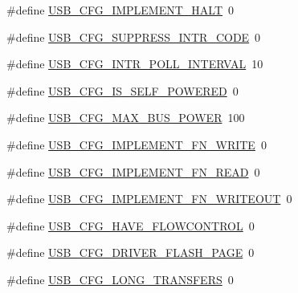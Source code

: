 \begin{DoxyCompactItemize}
\item 
\#define \hyperlink{mhvlib-_vusb-_console_2vusb_2usbconfig-prototype_8h_af2a9b3ecff1707f1b6554a881a87b954}{U\-S\-B\-\_\-\-C\-F\-G\-\_\-\-I\-M\-P\-L\-E\-M\-E\-N\-T\-\_\-\-H\-A\-L\-T}~0
\item 
\#define \hyperlink{mhvlib-_vusb-_console_2vusb_2usbconfig-prototype_8h_a51ab4fa0f312f536ec6d4bc99a75c1b6}{U\-S\-B\-\_\-\-C\-F\-G\-\_\-\-S\-U\-P\-P\-R\-E\-S\-S\-\_\-\-I\-N\-T\-R\-\_\-\-C\-O\-D\-E}~0
\item 
\#define \hyperlink{mhvlib-_vusb-_console_2vusb_2usbconfig-prototype_8h_a9cccddfefa62f926a0d7bba9f183a4d3}{U\-S\-B\-\_\-\-C\-F\-G\-\_\-\-I\-N\-T\-R\-\_\-\-P\-O\-L\-L\-\_\-\-I\-N\-T\-E\-R\-V\-A\-L}~10
\item 
\#define \hyperlink{mhvlib-_vusb-_console_2vusb_2usbconfig-prototype_8h_ad5fd70b5fabd8abd34d5b9ef7100b709}{U\-S\-B\-\_\-\-C\-F\-G\-\_\-\-I\-S\-\_\-\-S\-E\-L\-F\-\_\-\-P\-O\-W\-E\-R\-E\-D}~0
\item 
\#define \hyperlink{mhvlib-_vusb-_console_2vusb_2usbconfig-prototype_8h_abe324d9b00dc186bcbac65ed0f94811c}{U\-S\-B\-\_\-\-C\-F\-G\-\_\-\-M\-A\-X\-\_\-\-B\-U\-S\-\_\-\-P\-O\-W\-E\-R}~100
\item 
\#define \hyperlink{mhvlib-_vusb-_console_2vusb_2usbconfig-prototype_8h_a7f117e204e14ff1028ada59f622173f2}{U\-S\-B\-\_\-\-C\-F\-G\-\_\-\-I\-M\-P\-L\-E\-M\-E\-N\-T\-\_\-\-F\-N\-\_\-\-W\-R\-I\-T\-E}~0
\item 
\#define \hyperlink{mhvlib-_vusb-_console_2vusb_2usbconfig-prototype_8h_a6be8d20f2d0eb0e87460b26681e60611}{U\-S\-B\-\_\-\-C\-F\-G\-\_\-\-I\-M\-P\-L\-E\-M\-E\-N\-T\-\_\-\-F\-N\-\_\-\-R\-E\-A\-D}~0
\item 
\#define \hyperlink{mhvlib-_vusb-_console_2vusb_2usbconfig-prototype_8h_afebecafb2986c559a5d346d601be9de3}{U\-S\-B\-\_\-\-C\-F\-G\-\_\-\-I\-M\-P\-L\-E\-M\-E\-N\-T\-\_\-\-F\-N\-\_\-\-W\-R\-I\-T\-E\-O\-U\-T}~0
\item 
\#define \hyperlink{mhvlib-_vusb-_console_2vusb_2usbconfig-prototype_8h_a5495a12e572cdaa8e11358f92d1b324f}{U\-S\-B\-\_\-\-C\-F\-G\-\_\-\-H\-A\-V\-E\-\_\-\-F\-L\-O\-W\-C\-O\-N\-T\-R\-O\-L}~0
\item 
\#define \hyperlink{mhvlib-_vusb-_console_2vusb_2usbconfig-prototype_8h_ac0335c6066303683807fc117e336e7c4}{U\-S\-B\-\_\-\-C\-F\-G\-\_\-\-D\-R\-I\-V\-E\-R\-\_\-\-F\-L\-A\-S\-H\-\_\-\-P\-A\-G\-E}~0
\item 
\#define \hyperlink{mhvlib-_vusb-_console_2vusb_2usbconfig-prototype_8h_a7a4d92baced8a64f4c150b9b59d20844}{U\-S\-B\-\_\-\-C\-F\-G\-\_\-\-L\-O\-N\-G\-\_\-\-T\-R\-A\-N\-S\-F\-E\-R\-S}~0

\end{DoxyCompactItemize}
